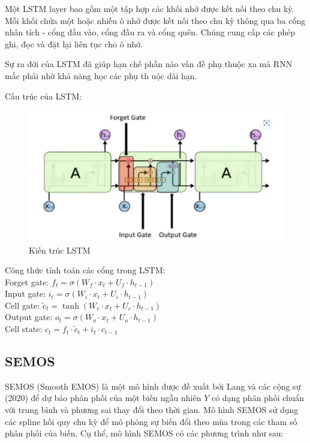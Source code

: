 \documentclass[conference]{IEEEtran}
\begin{document}
Một LSTM layer bao gồm một tập hợp các khối nhớ được kết nối theo chu kỳ. Mỗi khối chứa một hoặc nhiều ô nhớ được kết nối theo chu kỳ thông qua ba cổng nhân tích - cổng đầu vào, cổng đầu ra và cổng quên. Chúng cung cấp các phép ghi, đọc và đặt lại liên tục cho ô nhớ.

Sự ra đời của LSTM đã giúp hạn chế phần nào vấn đề phụ thuộc xa mà RNN mắc phải nhờ khả năng học các phụ th uộc dài hạn.

Cấu trúc của LSTM:
\begin{figure}[H]
    \centering
    \begin{minipage}{0.5\textwidth}
    \centering
    \includegraphics[width=1\textwidth]{Image/LSTM.png}
    \caption{Kiến trúc LSTM}
    \label{fig:1}
    \end{minipage}
\end{figure}
Công thức tính toán các cổng trong LSTM:\\
Forget gate: $f_t = \sigma(W_f \cdot x_t + U_f \cdot h_{t-1})$\\
Input gate: $i_t = \sigma(W_i \cdot x_t + U_i \cdot h_{t-1})$\\
Cell gate: $\tilde{c}_t = \tanh(W_c \cdot x_t + U_c \cdot h_{t-1})$\\
Output gate: $o_t = \sigma(W_o \cdot x_t + U_o \cdot h_{t-1})$\\
Cell state: $c_t = f_t \cdot \tilde{c}_t + i_t \cdot c_{t-1}$
\subsection{SEMOS}
SEMOS (Smooth EMOS) là một mô hình được đề xuất bởi Lang và các cộng sự (2020) để dự báo phân phối của một biến ngẫu nhiên \(Y\) có dạng phân phối chuẩn với trung bình và phương sai thay đổi theo thời gian. Mô hình SEMOS sử dụng các spline hồi quy chu kỳ để mô phỏng sự biến đổi theo mùa trong các tham số phân phối của biến.
Cụ thể, mô hình SEMOS có các phương trình như sau:
\end{document}
